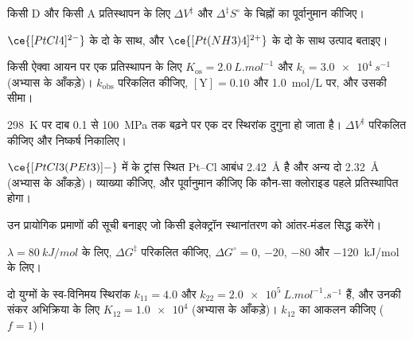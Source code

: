 \begin{exercise}[$\star$]\label{exo:b3:complex-mechanisms:3}
किसी D और किसी A प्रतिस्थापन के लिए $\Delta V^{\ddagger}$ और $\Delta^{\ddagger}S^\circ$ के चिह्नों का पूर्वानुमान कीजिए।
\end{exercise}

\begin{exercise}[$\star$]\label{exo:b3:complex-mechanisms:4}
$\ce{[PtCl4]^{2-}}$ के दो  के साथ, और $\ce{[Pt(NH3)4]^{2+}}$ के दो  के साथ उत्पाद बताइए।
\end{exercise}

\begin{exercise}[$\star\star$]\label{exo:b3:complex-mechanisms:5}
किसी ऐक्वा आयन पर एक प्रतिस्थापन के लिए $K_{\mathrm{os}} = \qty{2.0}{L.mol^{-1}}$ और $k_i = \qty{3.0e4}{s^{-1}}$ (अभ्यास के
आँकड़े)। $k_{\mathrm{obs}}$ परिकलित कीजिए, $[\mathrm Y] = 0.10$ और \qty{1.0}{mol/L} पर, और उसकी सीमा।
\end{exercise}

\begin{exercise}[$\star\star$]\label{exo:b3:complex-mechanisms:6}
\qty{298}{K} पर दाब 0.1 से \qty{100}{MPa} तक बढ़ने पर एक दर स्थिरांक दुगुना हो जाता है।
$\Delta V^{\ddagger}$ परिकलित कीजिए और निष्कर्ष निकालिए।
\end{exercise}

\begin{exercise}[$\star\star$]\label{exo:b3:complex-mechanisms:7}
$\ce{[PtCl3(PEt3)]-}$ में  के ट्रांस स्थित Pt--Cl आबंध \qty{2.42}{\angstrom} है और अन्य दो \qty{2.32}{\angstrom}
(अभ्यास के आँकड़े)। व्याख्या कीजिए, और पूर्वानुमान कीजिए कि कौन-सा क्लोराइड पहले प्रतिस्थापित होगा।
\end{exercise}

\begin{exercise}[$\star\star$]\label{exo:b3:complex-mechanisms:8}
उन प्रायोगिक प्रमाणों की सूची बनाइए जो किसी इलेक्ट्रॉन स्थानांतरण को आंतर-मंडल
सिद्ध करेंगे।
\end{exercise}

\begin{exercise}[$\star\star$]\label{exo:b3:complex-mechanisms:9}
$\lambda = \qty{80}{kJ/mol}$ के लिए, $\Delta G^{\ddagger}$ परिकलित कीजिए, $\Delta G^\circ = 0$, $-20$, $-80$ और \qty{-120}{kJ/mol} के लिए।
\end{exercise}

\begin{exercise}[$\star\star\star$]\label{exo:b3:complex-mechanisms:10}
दो युग्मों के स्व-विनिमय स्थिरांक $k_{11} = 4.0$ और $k_{22} = \qty{2.0e5}{L.mol^{-1}.s^{-1}}$ हैं, और
उनकी संकर अभिक्रिया के लिए $K_{12} = \num{1.0e4}$ (अभ्यास के आँकड़े)। $k_{12}$ का आकलन कीजिए ($f = 1$)।
\end{exercise}

